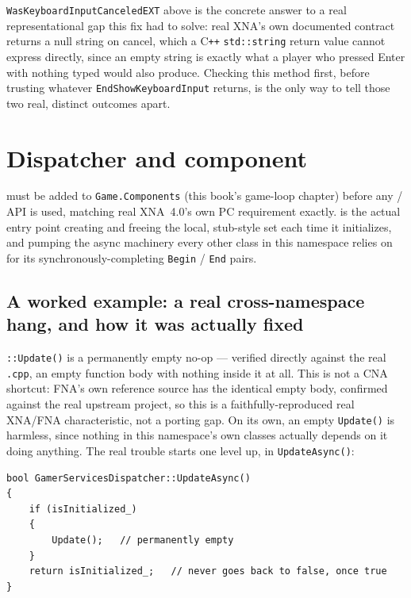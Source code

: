 \texttt{WasKeyboardInputCanceledEXT} above is the concrete answer to a real representational gap
this fix had to solve: real XNA's own documented contract returns a null string on cancel, which
a C\texttt{++} \texttt{std::string} return value cannot express directly, since an empty string
is exactly what a player who pressed Enter with nothing typed would also produce. Checking this
method first, before trusting whatever \texttt{EndShowKeyboardInput} returns, is the only way to
tell those two real, distinct outcomes apart.

\section{Dispatcher and component}

 must be added to \texttt{Game.Components}
(this book's game-loop chapter) before any  /  API is
used, matching real XNA~4.0's own PC requirement exactly. 
is the actual entry point creating and freeing the local, stub-style
 set each time it initializes, and pumping the async machinery every
other class in this namespace relies on for its synchronously-completing
\texttt{Begin} / \texttt{End} pairs.

\subsection{A worked example: a real cross-namespace hang, and how it was actually fixed}
\label{sec:gamerservices-hang}

\texttt{::Update()} is a permanently empty no-op --- verified
directly against the real \texttt{.cpp}, an empty function body with nothing inside it at all.
This is not a CNA shortcut: FNA's own reference source has the identical empty body, confirmed
against the real upstream project, so this is a faithfully-reproduced real XNA/FNA
characteristic, not a porting gap. On its own, an empty \texttt{Update()} is harmless, since
nothing in this namespace's own classes actually depends on it doing anything. The real trouble
starts one level up, in \texttt{UpdateAsync()}:

\begin{lstlisting}
bool GamerServicesDispatcher::UpdateAsync()
{
    if (isInitialized_)
    {
        Update();   // permanently empty
    }
    return isInitialized_;   // never goes back to false, once true
}
\end{lstlisting}

